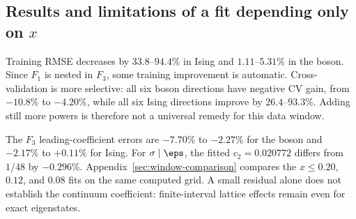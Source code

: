 \subsection{Results and limitations of a fit depending only on \texorpdfstring{$x$}{x}}
\begin{table}[p]\centering\scriptsize

\caption{Ising leading-only ($F_1$, $k=1$) and three-term ($F_3$, $k=3$)
fits to the same 77 points selected from Eq.~\eqref{eq:large-grid}
by $x\leq0.08$, with $p=1/2$ and critical Hamiltonian~\eqref{eq:Hising}.
Section~\ref{sec:fit-selection} specifies every contributing size and interval.
The coefficients multiply $(\pi x)^r$; $\alpha=4$ for
$I\leftrightarrow\eps$ and two otherwise. The degrees of freedom are
76 and 74. RMSE and CV RMSE are in nats; Gain is $G_K$ from
Eq.~\eqref{eq:metrics}. No coefficient is fixed to its CFT value.}
\label{tab:isingfits}
\end{table}
\begin{table}[p]\centering\scriptsize

\caption{Boson fits with the same geometries, probability, objective, and
parameter counts as Table~\ref{tab:isingfits}; $\alpha=2$ for every row.
States use charge codes $(0,0),(1,1),(3,1)$, lattice exponent $q=2$,
unit-circle coordinates, $w_1=0$, $W=w_2=10^8$, no orthogonalization,
and natural logarithms. All coefficients multiply powers of $\pi x$.
Gain compares training RMSE with the free-coefficient leading-only fit.}
\label{tab:bosonfits}
\end{table}

Training RMSE decreases by $33.8$--$94.4\%$ in Ising and
$1.11$--$5.31\%$ in the boson. Since $F_1$ is nested in $F_3$, some
training improvement is automatic. Cross-validation is more selective:
all six boson directions have negative CV gain, from $-10.8\%$ to
$-4.20\%$, while all six Ising directions
improve by $26.4$--$93.3\%$. Adding still more powers is therefore not a
universal remedy for this data window.

The $F_3$ leading-coefficient errors are $-7.70\%$ to $-2.27\%$ for the
boson and $-2.17\%$ to $+0.11\%$ for Ising.
For $\sigma\mid\eps$, the fitted $c_2=0.020772$ differs from $1/48$
by $-0.296\%$. Appendix~\ref{sec:window-comparison} compares the
$x\leq0.20$, $0.12$, and $0.08$ fits on the same computed grid.
A small residual alone does not establish the continuum coefficient:
finite-interval lattice effects remain even for exact eigenstates.

